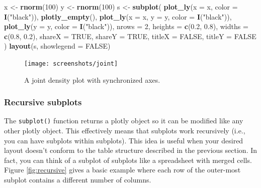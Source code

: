 \documentclass[12pt,]{isuthesis}
\newenvironment{Shaded}{\begin{snugshade}}{\end{snugshade}}
\newcommand{\KeywordTok}[1]{\textcolor[rgb]{0.13,0.29,0.53}{\textbf{{#1}}}}
\newcommand{\DataTypeTok}[1]{\textcolor[rgb]{0.13,0.29,0.53}{{#1}}}
\newcommand{\DecValTok}[1]{\textcolor[rgb]{0.00,0.00,0.81}{{#1}}}
\newcommand{\FloatTok}[1]{\textcolor[rgb]{0.00,0.00,0.81}{{#1}}}
\newcommand{\StringTok}[1]{\textcolor[rgb]{0.31,0.60,0.02}{{#1}}}
\newcommand{\OtherTok}[1]{\textcolor[rgb]{0.56,0.35,0.01}{{#1}}}
\newcommand{\NormalTok}[1]{{#1}}
\begin{document}
\begin{Shaded}
\begin{Highlighting}[]
\NormalTok{x <-}\StringTok{ }\KeywordTok{rnorm}\NormalTok{(}\DecValTok{100}\NormalTok{)}
\NormalTok{y <-}\StringTok{ }\KeywordTok{rnorm}\NormalTok{(}\DecValTok{100}\NormalTok{)}
\NormalTok{s <-}\StringTok{ }\KeywordTok{subplot}\NormalTok{(}
  \KeywordTok{plot_ly}\NormalTok{(}\DataTypeTok{x =} \NormalTok{x, }\DataTypeTok{color =} \KeywordTok{I}\NormalTok{(}\StringTok{"black"}\NormalTok{)), }
  \KeywordTok{plotly_empty}\NormalTok{(), }
  \KeywordTok{plot_ly}\NormalTok{(}\DataTypeTok{x =} \NormalTok{x, }\DataTypeTok{y =} \NormalTok{y, }\DataTypeTok{color =} \KeywordTok{I}\NormalTok{(}\StringTok{"black"}\NormalTok{)), }
  \KeywordTok{plot_ly}\NormalTok{(}\DataTypeTok{y =} \NormalTok{y, }\DataTypeTok{color =} \KeywordTok{I}\NormalTok{(}\StringTok{"black"}\NormalTok{)),}
  \DataTypeTok{nrows =} \DecValTok{2}\NormalTok{, }\DataTypeTok{heights =} \KeywordTok{c}\NormalTok{(}\FloatTok{0.2}\NormalTok{, }\FloatTok{0.8}\NormalTok{), }\DataTypeTok{widths =} \KeywordTok{c}\NormalTok{(}\FloatTok{0.8}\NormalTok{, }\FloatTok{0.2}\NormalTok{), }
  \DataTypeTok{shareX =} \OtherTok{TRUE}\NormalTok{, }\DataTypeTok{shareY =} \OtherTok{TRUE}\NormalTok{, }\DataTypeTok{titleX =} \OtherTok{FALSE}\NormalTok{, }\DataTypeTok{titleY =} \OtherTok{FALSE}
\NormalTok{)}
\KeywordTok{layout}\NormalTok{(s, }\DataTypeTok{showlegend =} \OtherTok{FALSE}\NormalTok{)}
\end{Highlighting}
\end{Shaded}

\begin{figure}
\centering
\texttt{[image: screenshots/joint]}
\caption{\label{fig:joint}A joint density plot with synchronized axes.}
\end{figure}

\subsubsection{Recursive subplots}\label{recursive-subplots}

The \texttt{subplot()} function returns a plotly object so it can be
modified like any other plotly object. This effectively means that
subplots work recursively (i.e., you can have subplots within subplots).
This idea is useful when your desired layout doesn't conform to the
table structure described in the previous section. In fact, you can
think of a subplot of subplots like a spreadsheet with merged cells.
Figure \ref{fig:recursive} gives a basic example where each row of the
outer-most subplot contains a different number of columns.
\end{document}

